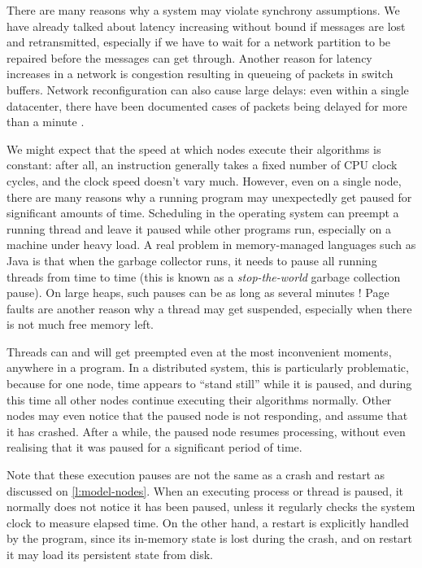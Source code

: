 There are many reasons why a system may violate synchrony assumptions.
We have already talked about latency increasing without bound if messages are lost and retransmitted, especially if we have to wait for a network partition to be repaired before the messages can get through.
Another reason for latency increases in a network is congestion resulting in queueing of packets in switch buffers.
Network reconfiguration can also cause large delays: even within a single datacenter, there have been documented cases of packets being delayed for more than a minute \citep{Imbriaco:2012tx}.

We might expect that the speed at which nodes execute their algorithms is constant: after all, an instruction generally takes a fixed number of CPU clock cycles, and the clock speed doesn't vary much.
However, even on a single node, there are many reasons why a running program may unexpectedly get paused for significant amounts of time.
Scheduling in the operating system can preempt a running thread and leave it paused while other programs run, especially on a machine under heavy load.
A real problem in memory-managed languages such as Java is that when the garbage collector runs, it needs to pause all running threads from time to time (this is known as a \emph{stop-the-world} garbage collection pause).
On large heaps, such pauses can be as long as several minutes \citep{Thompson:2013}!
Page faults are another reason why a thread may get suspended, especially when there is not much free memory left.

Threads can and will get preempted even at the most inconvenient moments, anywhere in a program.
In a distributed system, this is particularly problematic, because for one node, time appears to ``stand still'' while it is paused, and during this time all other nodes continue executing their algorithms normally.
Other nodes may even notice that the paused node is not responding, and assume that it has crashed.
After a while, the paused node resumes processing, without even realising that it was paused for a significant period of time.

Note that these execution pauses are not the same as a crash and restart as discussed on \autoref{l:model-nodes}.
When an executing process or thread is paused, it normally does not notice it has been paused, unless it regularly checks the system clock to measure elapsed time.
On the other hand, a restart is explicitly handled by the program, since its in-memory state is lost during the crash, and on restart it may load its persistent state from disk.

